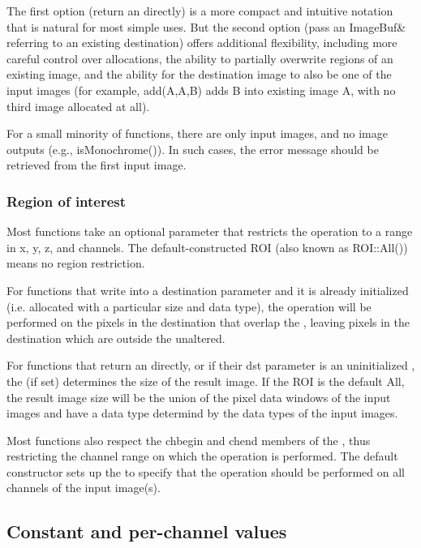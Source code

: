 The first option (return an \ImageBuf directly) is a more compact and
intuitive notation that is natural for most simple uses. But the second
option (pass an {\cf ImageBuf\&} referring to an existing destination)
offers additional flexibility, including more careful control over
allocations, the ability to partially overwrite regions of an existing
image, and the ability for the destination image to also be one of the input
images (for example, add(A,A,B) adds B into existing image A, with no third
image allocated at all).

For a small minority of \IBA functions, there are only input images, and
no image outputs (e.g., {\cf isMonochrome()}).  In such cases, the error
message should be retrieved from the first input image.

\subsubsection*{Region of interest}

Most \IBA functions take an optional \ROI parameter that restricts the
operation to a range in x, y, z, and channels. The default-constructed ROI
(also known as {\cf ROI::All()}) means no region restriction.

For \IBA functions that write into a destination \ImageBuf parameter and it
is already initialized (i.e. allocated with a particular size and data
type), the operation will be performed on the pixels in the destination that
overlap the \ROI, leaving pixels in the destination which are outside the
\ROI unaltered.

For \IBA functions that return an \ImageBuf directly, or if their {\cf dst}
parameter is an uninitialized \ImageBuf, the \ROI (if set) determines the
size of the result image. If the ROI is the default {\cf All}, the result
image size will be the union of the pixel data windows of the input images
and have a data type determind by the data types of the input images.

Most \IBA functions also respect the {\cf chbegin} and {\cf chend}
members of the \ROI, thus restricting the channel range on which the
operation is performed.  The default \ROI constructor sets up the \ROI
to specify that the operation should be performed on all channels of
the input image(s).

\subsection*{Constant and per-channel values}

